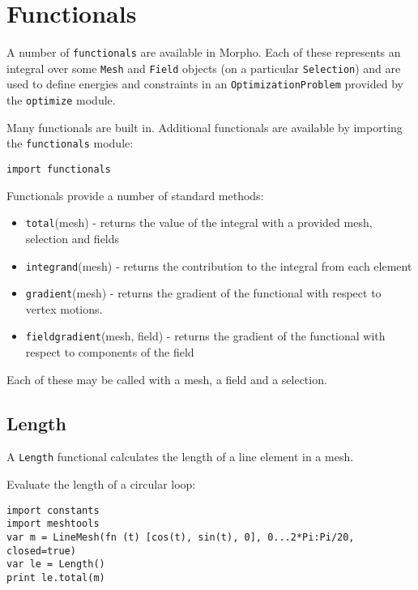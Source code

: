 \hypertarget{functionals}{%
\section{Functionals}\label{functionals}}

A number of \texttt{functionals} are available in Morpho. Each of these
represents an integral over some \texttt{Mesh} and \texttt{Field}
objects (on a particular \texttt{Selection}) and are used to define
energies and constraints in an \texttt{OptimizationProblem} provided by
the \texttt{optimize} module.

Many functionals are built in. Additional functionals are available by
importing the \texttt{functionals} module:

\begin{lstlisting}
import functionals
\end{lstlisting}

Functionals provide a number of standard methods:

\begin{itemize}

\item
  \texttt{total}(mesh) - returns the value of the integral with a
  provided mesh, selection and fields
\item
  \texttt{integrand}(mesh) - returns the contribution to the integral
  from each element
\item
  \texttt{gradient}(mesh) - returns the gradient of the functional with
  respect to vertex motions.
\item
  \texttt{fieldgradient}(mesh, field) - returns the gradient of the
  functional with respect to components of the field
\end{itemize}

Each of these may be called with a mesh, a field and a selection.

\hypertarget{length}{%
\subsection{Length}\label{length}}

A \texttt{Length} functional calculates the length of a line element in
a mesh.

Evaluate the length of a circular loop:

\begin{lstlisting}
import constants
import meshtools
var m = LineMesh(fn (t) [cos(t), sin(t), 0], 0...2*Pi:Pi/20, closed=true)
var le = Length()
print le.total(m)
\end{lstlisting}

